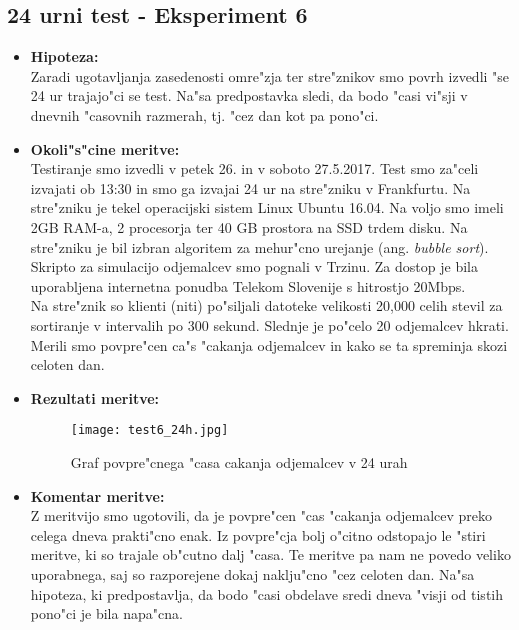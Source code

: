 \newpage
\subsection{24 urni test - Eksperiment 6}
\begin{itemize}
	\item \textbf{Hipoteza: }  \\
		Zaradi ugotavljanja zasedenosti omre"zja ter stre"znikov smo povrh izvedli "se 24 ur trajajo"ci se test. Na"sa predpostavka sledi, da bodo "casi vi"sji v dnevnih "casovnih razmerah, tj. "cez dan kot pa pono"ci.
			
	\item \textbf{Okoli"s"cine meritve: } \\
		Testiranje smo izvedli v petek 26. in v soboto 27.5.2017. Test smo za"celi izvajati ob 13:30 in smo ga izvajai 24 ur na stre"zniku v Frankfurtu. Na stre"zniku je tekel operacijski sistem Linux Ubuntu 16.04. Na voljo smo imeli 2GB RAM-a, 2 procesorja ter 40 GB prostora na SSD trdem disku. Na stre"zniku je bil izbran algoritem za mehur"cno urejanje (ang. \textit{bubble sort}).\\ Skripto za simulacijo odjemalcev smo pognali v Trzinu. Za dostop je bila uporabljena internetna ponudba Telekom Slovenije s hitrostjo 20Mbps.\\ Na stre"znik so klienti (niti) po"siljali datoteke velikosti 20,000 celih stevil za sortiranje v intervalih po 300 sekund. Slednje je po"celo 20 odjemalcev hkrati. Merili smo povpre"cen ca"s "cakanja odjemalcev in kako se ta spreminja skozi celoten dan. 

 	\item \textbf{Rezultati meritve: }  \\
		\begin{figure}[h]
  		\centering
  		  \texttt{[image: test6\_24h.jpg]}
  		\caption{Graf povpre"cnega "casa cakanja odjemalcev v 24 urah }
  		\label{8_graf_racunska_moc_50}
		\end{figure}

	\item \textbf{Komentar meritve: } \\ 
		Z meritvijo smo ugotovili, da je povpre"cen "cas "cakanja odjemalcev preko celega dneva prakti"cno enak. Iz povpre"cja bolj o"citno odstopajo le "stiri meritve, ki so trajale ob"cutno dalj "casa. Te meritve pa nam ne povedo veliko uporabnega, saj so razporejene dokaj naklju"cno "cez celoten dan. Na"sa hipoteza, ki predpostavlja, da bodo "casi obdelave sredi dneva "visji od tistih pono"ci je bila napa"cna.
\end{itemize}

